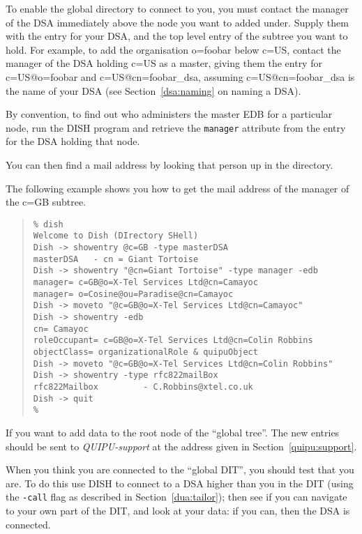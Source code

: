 To enable the global directory to connect to you, you must contact the
manager of the DSA immediately above the node you want to added under.
Supply them with the entry for your DSA, and the top level 
entry of the subtree
you want to hold.
For example, to add the organisation o=foobar below c=US,
contact the manager of the DSA holding c=US as a master, giving them the
entry for c=US@o=foobar and c=US@cn=foobar\_dsa, assuming
c=US@cn=foobar\_dsa is the name of your DSA (see Section~\ref{dsa:naming}
on naming a DSA).

By convention,
to find out who administers the master EDB for a particular node,
run the DISH program and retrieve the \verb"manager" attribute
from the entry for the DSA holding that node.

You can then find a mail address by looking that person up in the directory.

The following example shows you how to get the mail address of the
manager of the c=GB subtree. 

\begin{footnotesize}\begin{quote}\begin{verbatim}
% dish
Welcome to Dish (DIrectory SHell)
Dish -> showentry @c=GB -type masterDSA
masterDSA 	- cn = Giant Tortoise
Dish -> showentry "@cn=Giant Tortoise" -type manager -edb 
manager= c=GB@o=X-Tel Services Ltd@cn=Camayoc
manager= o=Cosine@ou=Paradise@cn=Camayoc
Dish -> moveto "@c=GB@o=X-Tel Services Ltd@cn=Camayoc"
Dish -> showentry -edb
cn= Camayoc
roleOccupant= c=GB@o=X-Tel Services Ltd@cn=Colin Robbins
objectClass= organizationalRole & quipuObject
Dish -> moveto "@c=GB@o=X-Tel Services Ltd@cn=Colin Robbins"
Dish -> showentry -type rfc822mailBox
rfc822Mailbox         - C.Robbins@xtel.co.uk
Dish -> quit
%
\end{verbatim}\end{quote}\end{footnotesize}

If you want to add data to the root node of the ``global tree''.
The new entries should be sent to {\em QUIPU-support} at the address given in
Section~\ref{quipu:support}.

When you think you are connected to the ``global DIT'', 
you should test that you are.  To do this use DISH to connect 
to a DSA higher than you in the DIT (using the \verb"-call" flag as described
in Section~\ref{dua:tailor}); then see if you can navigate to your
own part of the DIT, and look at your data: if you can,  
then the DSA is connected.

